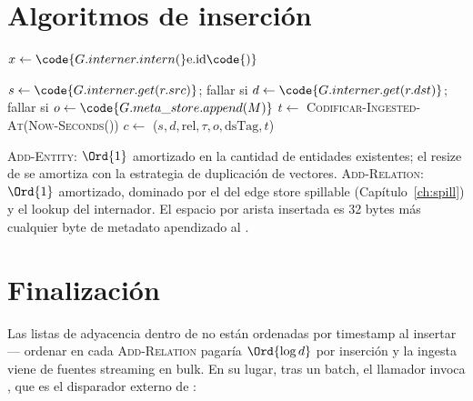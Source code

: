 \section{Algoritmos de inserción}

\begin{algorithm}
\caption{\textsc{Add-Entity}}\label{alg:add-entity}
$x \gets \code{G.interner.intern(}\text{e.id}\code{)}$\;
\;
\;
\;
\;
\;
\Return\;
\end{algorithm}

\begin{algorithm}
\caption{\textsc{Add-Relation}}\label{alg:add-relation}
$s \gets \code{G.interner.get(r.src)}$; fallar si \;
$d \gets \code{G.interner.get(r.dst)}$; fallar si \;
$o \gets \code{G.meta\_store.append(M)}$\;
$t \gets $ \textsc{Codificar-Ingested-At}(\textsc{Now-Seconds}())\;
$c \gets $ \Compact{}($s, d, \text{rel}, \tau, o, \text{dsTag}, t$)\;
\;
\;
\Return\;
\end{algorithm}

\begin{complexity}
\textsc{Add-Entity}: $\Ord{1}$ amortizado en la cantidad de
entidades existentes; el resize de  se
amortiza con la estrategia de duplicación de vectores.
\textsc{Add-Relation}: $\Ord{1}$ amortizado, dominado por el
 del edge store spillable (Capítulo~\ref{ch:spill})
y el lookup del internador. El espacio por arista insertada es
32 bytes más cualquier byte de metadato apendizado al
.
\end{complexity}

\section{Finalización}

Las listas de adyacencia dentro de  no están
ordenadas por timestamp al insertar --- ordenar en cada
\textsc{Add-Relation} pagaría $\Ord{\log d}$ por inserción y la
ingesta viene de fuentes streaming en bulk. En su lugar, tras un
batch, el llamador invoca , que
es el disparador externo de :

